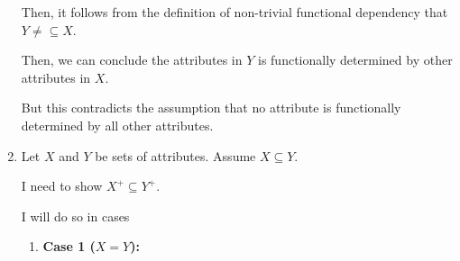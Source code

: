 \documentclass[12pt]{article}
\begin{document}
\begin{enumerate}[1.]
        \bigskip

        Then, it follows from the definition of non-trivial functional dependency
        that $Y \neq\subseteq X$.

        \bigskip

        Then, we can conclude the attributes in $Y$ is functionally determined by other
        attributes in $X$.

        \bigskip

        But this contradicts the assumption that no attribute is functionally
        determined by all other attributes.

        \bigskip












        \item

        Let $X$ and $Y$ be sets of attributes. Assume $X \subseteq Y$.

        \bigskip

        I need to show $X^+ \subseteq Y^+$.

        \bigskip

        I will do so in cases

        \begin{enumerate}[1.]
            \item \textbf{Case 1 ($X = Y$):}


\end{enumerate}
\end{enumerate}
\end{document}
